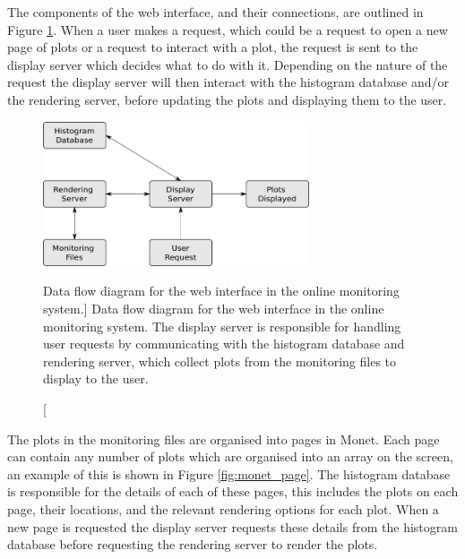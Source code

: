 The components of the web interface, and their connections, are outlined in 
Figure \ref{fig:monet_flow}. When a user makes a request, which could be a
request to open a new page of plots or a request to interact with a plot, the 
request is sent to the display server which decides what to do with it.
Depending on the nature of the request the display server will then interact
with the histogram database and/or the rendering server, before updating the
plots and displaying them to the user. 

\begin{figure}

	\centering

	\includegraphics[width=0.7\textwidth]{figures/monet_flow.png}

	\caption
	[Data flow diagram for the web interface in the \protodune{} online 
	monitoring system.] 
	{Data flow diagram for the web interface in the \protodune{} online 
	monitoring system. The display server is responsible for handling user
	requests by communicating with the histogram database and rendering server,
	which collect plots from the monitoring files to display to the user.} 
	\label{fig:monet_flow}

\end{figure}

The plots in the monitoring files are organised into pages in Monet. Each page
can contain any number of plots which are organised into an array on the screen,
an example of this is shown in Figure \ref{fig:monet_page}. The histogram 
database is responsible for the details of each of these pages, this includes
the plots on each page, their locations, and the relevant rendering options for
each plot. When a new page is requested the display server requests these
details from the histogram database before requesting the rendering server to 
render the plots.

